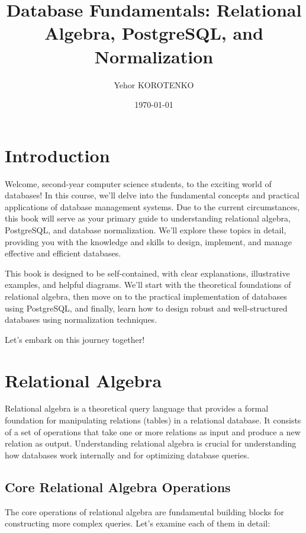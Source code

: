 \documentclass[12pt]{book}
\title{Database Fundamentals: Relational Algebra, PostgreSQL, and Normalization}
\author{Yehor KOROTENKO} %
\date{\today}
\begin{document}
\maketitle

\tableofcontents

\chapter{Introduction}

Welcome, second-year computer science students, to the exciting world of databases! In this course, we'll delve into the fundamental concepts and practical applications of database management systems. Due to the current circumstances, this book will serve as your primary guide to understanding relational algebra, PostgreSQL, and database normalization. We'll explore these topics in detail, providing you with the knowledge and skills to design, implement, and manage effective and efficient databases.

This book is designed to be self-contained, with clear explanations, illustrative examples, and helpful diagrams. We'll start with the theoretical foundations of relational algebra, then move on to the practical implementation of databases using PostgreSQL, and finally, learn how to design robust and well-structured databases using normalization techniques.

Let's embark on this journey together!

\chapter{Relational Algebra}

Relational algebra is a theoretical query language that provides a formal foundation for manipulating relations (tables) in a relational database. It consists of a set of operations that take one or more relations as input and produce a new relation as output. Understanding relational algebra is crucial for understanding how databases work internally and for optimizing database queries.

\section{Core Relational Algebra Operations}

The core operations of relational algebra are fundamental building blocks for constructing more complex queries. Let's examine each of them in detail:
\end{document}
